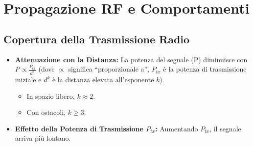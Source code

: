 \section{Propagazione RF e Comportamenti}

\subsection{Copertura della Trasmissione Radio}
\begin{itemize}
    \item \textbf{Attenuazione con la Distanza:} La potenza del segnale (P) diminuisce con $P \propto \frac{P_{tx}}{d^k}$ (dove $\propto$ significa ``proporzionale a'', $P_{tx}$ è la potenza di trasmissione iniziale e $d^k$ è la distanza elevata all'esponente $k$).
    \begin{itemize}
        \item In spazio libero, $k \approx 2$.
        \item Con ostacoli, $k \ge 3$.
    \end{itemize}
    \item \textbf{Effetto della Potenza di Trasmissione $P_{tx}$:} Aumentando $P_{tx}$, il segnale arriva più lontano.
\end{itemize}

